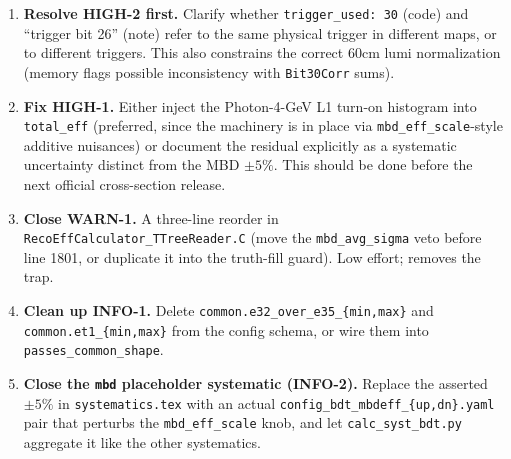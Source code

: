 \documentclass[11pt,a4paper]{article}
\begin{document}
\begin{enumerate}
  \item \textbf{Resolve HIGH-2 first.} Clarify whether
  \texttt{trigger\_used: 30} (code) and ``trigger bit 26'' (note) refer
  to the same physical trigger in different maps, or to different
  triggers. This also constrains the correct 60cm lumi normalization
  (memory flags possible inconsistency with \texttt{Bit30Corr} sums).
  \item \textbf{Fix HIGH-1.} Either inject the Photon-4-GeV L1
  turn-on histogram into \texttt{total\_eff} (preferred, since the
  machinery is in place via \texttt{mbd\_eff\_scale}-style additive
  nuisances) or document the residual explicitly as a systematic
  uncertainty distinct from the MBD $\pm 5\%$. This should be done
  before the next official cross-section release.
  \item \textbf{Close WARN-1.} A three-line reorder in
  \texttt{RecoEffCalculator\_TTreeReader.C} (move the
  \texttt{mbd\_avg\_sigma} veto before line 1801, or duplicate it into
  the truth-fill guard). Low effort; removes the trap.
  \item \textbf{Clean up INFO-1.} Delete
  \texttt{common.e32\_over\_e35\_\{min,max\}} and
  \texttt{common.et1\_\{min,max\}} from the config schema, or wire them
  into \texttt{passes\_common\_shape}.
  \item \textbf{Close the \texttt{mbd} placeholder systematic
  (INFO-2).} Replace the asserted $\pm 5\%$ in
  \texttt{systematics.tex} with an actual
  \texttt{config\_bdt\_mbdeff\_\{up,dn\}.yaml} pair that perturbs the
  \texttt{mbd\_eff\_scale} knob, and let
  \texttt{calc\_syst\_bdt.py} aggregate it like the other systematics.
\end{enumerate}
\end{document}
